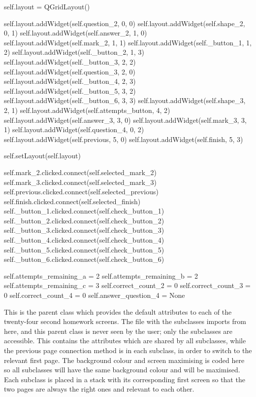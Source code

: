 \begin{python}
        self.layout = QGridLayout()

        self.layout.addWidget(self.question_2, 0, 0)
        self.layout.addWidget(self.shape_2, 0, 1)
        self.layout.addWidget(self.answer_2, 1, 0)
        self.layout.addWidget(self.mark_2, 1, 1)
        self.layout.addWidget(self._button_1, 1, 2)
        self.layout.addWidget(self._button_2, 1, 3)
        self.layout.addWidget(self._button_3, 2, 2)
        self.layout.addWidget(self.question_3, 2, 0)
        self.layout.addWidget(self._button_4, 2, 3)
        self.layout.addWidget(self._button_5, 3, 2)
        self.layout.addWidget(self._button_6, 3, 3)
        self.layout.addWidget(self.shape_3, 2, 1)
        self.layout.addWidget(self.attempts_button, 4, 2)
        self.layout.addWidget(self.answer_3, 3, 0)
        self.layout.addWidget(self.mark_3, 3, 1)
        self.layout.addWidget(self.question_4, 0, 2)
        self.layout.addWidget(self.previous, 5, 0)
        self.layout.addWidget(self.finish, 5, 3)

        self.setLayout(self.layout)

        self.mark_2.clicked.connect(self.selected_mark_2)
        self.mark_3.clicked.connect(self.selected_mark_3)
        self.previous.clicked.connect(self.selected_previous)
        self.finish.clicked.connect(self.selected_finish)
        self._button_1.clicked.connect(self.check_button_1)
        self._button_2.clicked.connect(self.check_button_2)
        self._button_3.clicked.connect(self.check_button_3)
        self._button_4.clicked.connect(self.check_button_4)
        self._button_5.clicked.connect(self.check_button_5)
        self._button_6.clicked.connect(self.check_button_6)

        self.attempts_remaining_a = 2
        self.attempts_remaining_b = 2
        self.attempts_remaining_c = 3
        self.correct_count_2 = 0
        self.correct_count_3 = 0
        self.correct_count_4 = 0
        self.answer_question_4 = None
\end{python}

This is the parent class which provides the default attributes to each of the twenty-four second homework screens. The file with the subclasses imports from here, and this parent class is never seen by the user; only the subclasses are accessible. This contains the attributes which are shared by all subclasses, while the previous page connection method is in each subclass, in order to switch to the relevant first page. The background colour and screen maximising is coded here so all subclasses will have the same background colour and will be maximised. Each subclass is placed in a stack with its corresponding first screen so that the two pages are always the right ones and relevant to each other.

